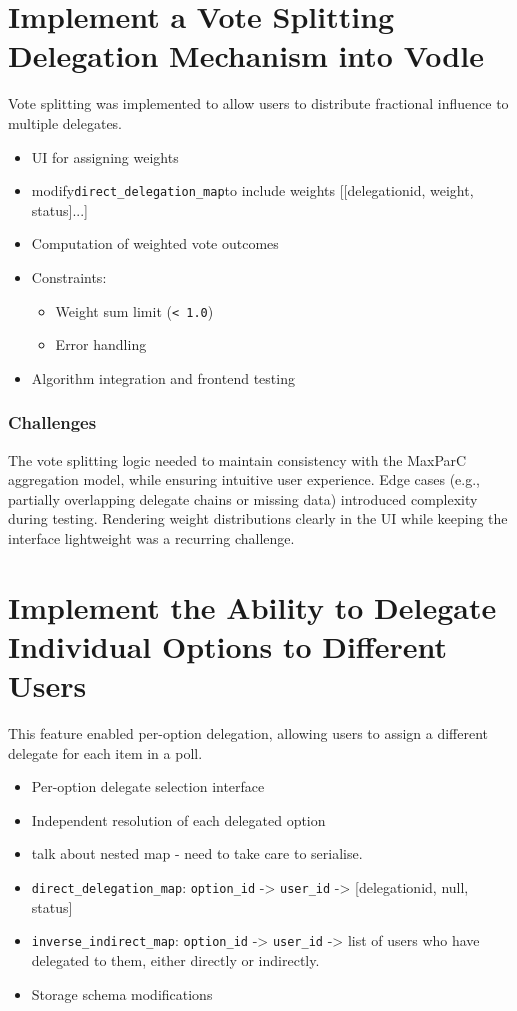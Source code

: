 \section{Implement a Vote Splitting Delegation Mechanism into Vodle}
Vote splitting was implemented to allow users to distribute fractional influence to multiple delegates.

\begin{itemize}
  \item UI for assigning weights
  \item modify\verb|direct_delegation_map|to include weights [[delegationid, weight, status]...]
  \item Computation of weighted vote outcomes
  \item Constraints:
  \begin{itemize}
    \item Weight sum limit (\texttt{< 1.0})
    \item Error handling
  \end{itemize}
  \item Algorithm integration and frontend testing
\end{itemize}

\subsubsection{Challenges}
The vote splitting logic needed to maintain consistency with the MaxParC aggregation model, while ensuring intuitive user experience. Edge cases (e.g., partially overlapping delegate chains or missing data) introduced complexity during testing. Rendering weight distributions clearly in the UI while keeping the interface lightweight was a recurring challenge.

\section{Implement the Ability to Delegate Individual Options to Different Users}
This feature enabled per-option delegation, allowing users to assign a different delegate for each item in a poll.

\begin{itemize}
  \item Per-option delegate selection interface
  \item Independent resolution of each delegated option
  \item talk about nested map - need to take care to serialise.
  \item \verb|direct_delegation_map|: \verb|option_id| -> \verb|user_id| -> [delegationid, null, status]
  \item \verb|inverse_indirect_map|: \verb|option_id| -> \verb|user_id| -> list of users who have delegated to them, either directly or indirectly.
  \item Storage schema modifications
\end{itemize}

